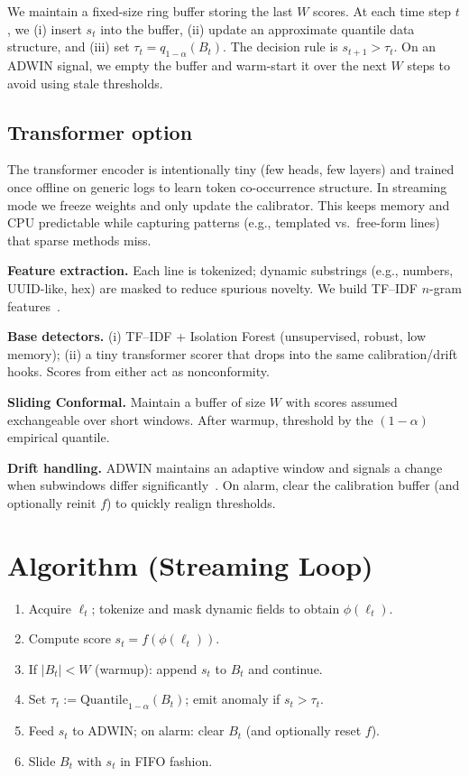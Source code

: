 \documentclass[10pt,twocolumn]{article}
\begin{document}
We maintain a fixed-size ring buffer storing the last $W$ scores. At each time step $t$, we (i) insert $s_t$ into the buffer, (ii) update an approximate quantile data structure, and (iii) set $\tau_t = q_{1-\alpha}(B_t)$. The decision rule is $s_{t+1} > \tau_t$. On an ADWIN signal, we empty the buffer and warm-start it over the next $W$ steps to avoid using stale thresholds.

\subsection*{Transformer option}

The transformer encoder is intentionally tiny (few heads, few layers) and trained once offline on generic logs to learn token co-occurrence structure. In streaming mode we freeze weights and only update the calibrator. This keeps memory and CPU predictable while capturing patterns (e.g., templated vs.\ free-form lines) that sparse methods miss.


\textbf{Feature extraction.} Each line is tokenized; dynamic substrings (e.g., numbers, UUID-like, hex) are masked to reduce spurious novelty. We build TF--IDF $n$-gram features~\cite{salton1988tfidf}. \vspace{0.25em}

\noindent\textbf{Base detectors.} (i) TF--IDF + Isolation Forest (unsupervised, robust, low memory); (ii) a tiny transformer scorer that drops into the same calibration/drift hooks. Scores from either act as nonconformity. \vspace{0.25em}

\noindent\textbf{Sliding Conformal.} Maintain a buffer of size $W$ with scores assumed exchangeable over short windows. After warmup, threshold by the $(1-\alpha)$ empirical quantile. \vspace{0.25em}

\noindent\textbf{Drift handling.} ADWIN maintains an adaptive window and signals a change when subwindows differ significantly~\cite{bifet2007adwin}. On alarm, clear the calibration buffer (and optionally reinit $f$) to quickly realign thresholds.

\section{Algorithm (Streaming Loop)}
\begin{enumerate}[leftmargin=*]
  \item Acquire $\ell_t$; tokenize and mask dynamic fields to obtain $\phi(\ell_t)$.
  \item Compute score $s_t=f(\phi(\ell_t))$.
  \item If $|B_t|<W$ (warmup): append $s_t$ to $B_t$ and continue.
  \item Set $\tau_t := \mathrm{Quantile}_{1-\alpha}(B_t)$; emit anomaly if $s_t>\tau_t$.
  \item Feed $s_t$ to ADWIN; on alarm: clear $B_t$ (and optionally reset $f$).
  \item Slide $B_t$ with $s_t$ in FIFO fashion.
\end{enumerate}
\end{document}
